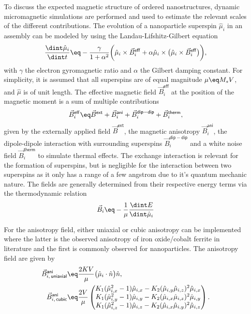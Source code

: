 \documentclass[\main/dresen_thesis.tex]{subfiles}
\begin{document}
  To discuss the expected magnetic structure of ordered nanostructures, dynamic micromagnetic simulations are performed and used to estimate the relevant scales of the different contributions.
  The evolution of a nanoparticle superspin $\hat{\mu}_i$ in an assembly can be modeled by using the Landau-Lifshitz-Gilbert equation
  \begin{align}
    \frac{\dint \hat{\mu}_i}{\dint t} \eq - \frac{\gamma}{1 + \alpha^2} \biggl( \hat{\mu}_i \times \vec{B}_i^\mathsf{eff} + \alpha \hat{\mu}_i \times \bigl(\hat{\mu}_i \times \vec{B}_i^\mathsf{eff} \bigr) \biggr),
  \end{align}
  with $\gamma$ the electron gyromagnetic ratio and $\alpha$ the Gilbert damping constant.
  For simplicity, it is assumed that all superspins are of equal magnitude $\mu \eq M_s V$, and $\hat{\mu}$ is of unit length.
  The effective magnetic field $\vec{B}_i^\mathsf{eff}$ at the position of the magnetic moment is a sum of multiple contributions
  \begin{align}
    \vec{B}_i^\mathsf{eff} \eq \vec{B}^\mathsf{ext} + \vec{B}^\mathsf{ani}_i + \vec{B}^\mathsf{dip-dip}_i + \vec{B}^\mathsf{therm}_i,
  \end{align}
  given by the externally applied field $\vec{B}^\mathsf{ext}$, the magnetic anisotropy $\vec{B}^\mathsf{ani}_i$, the dipole-dipole interaction with surrounding superspins $\vec{B}^\mathsf{dip-dip}_i$ and a white noise field $\vec{B}^\mathsf{therm}_i$ to simulate thermal effects.
  The exchange interaction is relevant for the formation of superspins, but is negligible for the interaction between two superspins as it only has a range of a few angstrom due to it's quantum mechanic nature.
  The fields are generally determined from their respective energy terms via the thermodynamic relation
  \begin{align}
    \vec{B}_i \eq - \frac{1}{\mu} \frac{\dint E}{\dint \hat{\mu}_i}
  \end{align}

  For the anisotropy field, either uniaxial or cubic anisotropy can be implemented where the latter is the observed anisotropy of iron oxide/cobalt ferrite in literature and the first is commonly observed for nanoparticles.
  The anisotropy field are given by
  \begin{align}
    \vec{B}^\mathsf{ani}_{i, \,\mathsf{uniaxial}} &\eq \frac{2 K V}{\mu} \bigl( \hat{\mu}_i \cdot \hat{n} \bigr) \hat{n},\\
    \vec{B}^\mathsf{ani}_{i, \,\mathsf{cubic}} &\eq \frac{2 V}{\mu} \begin{pmatrix}
      K_1 (\hat{\mu}_{i, x}^2 - 1) \hat{\mu}_{i, x} - K_2 (\hat{\mu}_{i, y} \hat{\mu}_{i, z})^2 \hat{\mu}_{i, x} \\
      K_1 (\hat{\mu}_{i, y}^2 - 1) \hat{\mu}_{i, y} - K_2 (\hat{\mu}_{i, x} \hat{\mu}_{i, z})^2 \hat{\mu}_{i, y} \\
      K_1 (\hat{\mu}_{i, z}^2 - 1) \hat{\mu}_{i, z} - K_2 (\hat{\mu}_{i, x} \hat{\mu}_{i, y})^2 \hat{\mu}_{i, z}
    \end{pmatrix}.
  \end{align}
\end{document}

